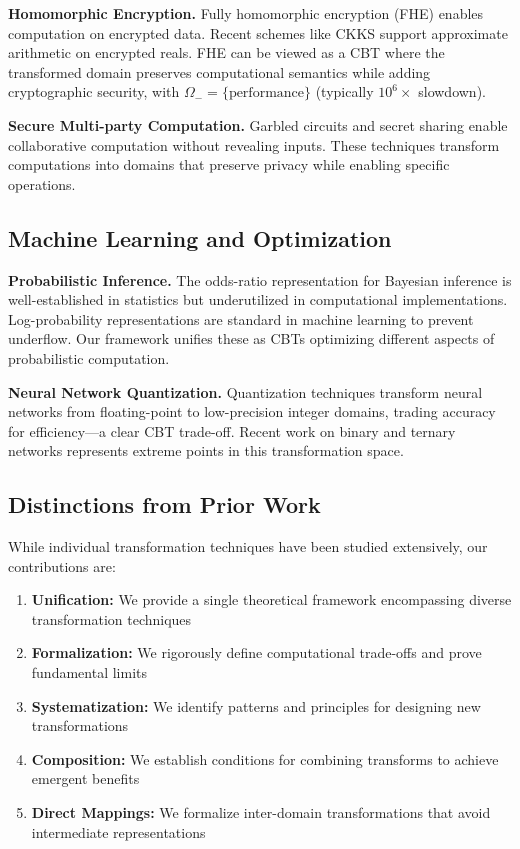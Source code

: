 \documentclass[11pt]{article}
\theoremstyle{definition}
\begin{document}
\textbf{Homomorphic Encryption.} Fully homomorphic encryption (FHE) \cite{gentry2009fully} enables computation on encrypted data. Recent schemes like CKKS \cite{cheon2017homomorphic} support approximate arithmetic on encrypted reals. FHE can be viewed as a CBT where the transformed domain preserves computational semantics while adding cryptographic security, with $\Omega_- = \{\text{performance}\}$ (typically $10^6\times$ slowdown).

\textbf{Secure Multi-party Computation.} Garbled circuits \cite{yao1986generate} and secret sharing \cite{shamir1979share} enable collaborative computation without revealing inputs. These techniques transform computations into domains that preserve privacy while enabling specific operations.

\subsection{Machine Learning and Optimization}

\textbf{Probabilistic Inference.} The odds-ratio representation for Bayesian inference is well-established in statistics \cite{agresti2003categorical} but underutilized in computational implementations. Log-probability representations are standard in machine learning \cite{bishop2006pattern} to prevent underflow. Our framework unifies these as CBTs optimizing different aspects of probabilistic computation.

\textbf{Neural Network Quantization.} Quantization techniques \cite{jacob2018quantization} transform neural networks from floating-point to low-precision integer domains, trading accuracy for efficiency—a clear CBT trade-off. Recent work on binary \cite{courbariaux2016binarized} and ternary \cite{zhu2016trained} networks represents extreme points in this transformation space.

\subsection{Distinctions from Prior Work}

While individual transformation techniques have been studied extensively, our contributions are:
\begin{enumerate}
\item \textbf{Unification:} We provide a single theoretical framework encompassing diverse transformation techniques
\item \textbf{Formalization:} We rigorously define computational trade-offs and prove fundamental limits
\item \textbf{Systematization:} We identify patterns and principles for designing new transformations
\item \textbf{Composition:} We establish conditions for combining transforms to achieve emergent benefits
\item \textbf{Direct Mappings:} We formalize inter-domain transformations that avoid intermediate representations
\end{enumerate}
\end{document}
